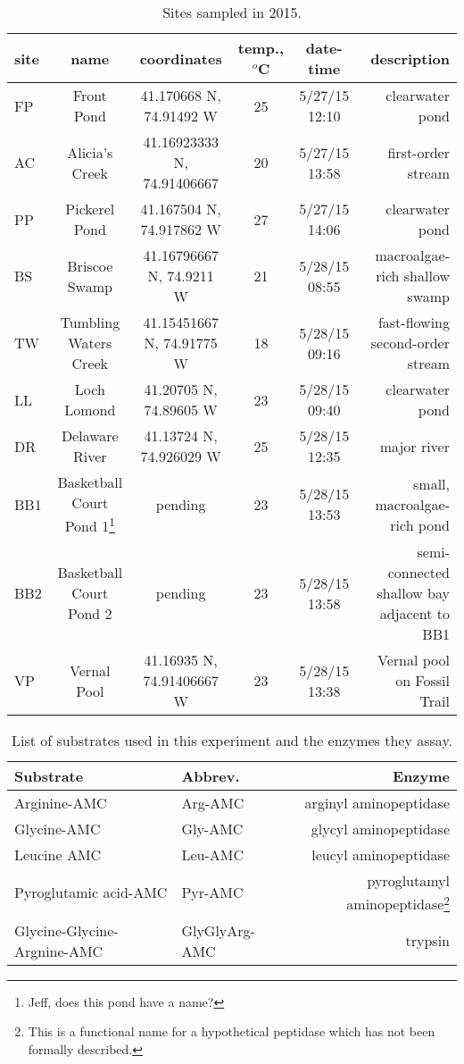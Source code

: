 \documentclass{article}
\begin{document}
    \begin{landscape}
    
    \begin{table}
    \centering
    \begin{tabular}{l c c c c r}
    site & name & coordinates & temp., $^o$C & date-time & description \\
    \hline
    FP & Front Pond & 41.170668 N, 74.91492 W & 25 & 5/27/15 12:10 & clearwater pond \\
    AC & Alicia's Creek & 41.16923333 N, 74.91406667 & 20 & 5/27/15 13:58 & first-order stream \\
    PP & Pickerel Pond & 41.167504 N, 74.917862 W & 27 & 5/27/15 14:06 & clearwater pond \\
    BS & Briscoe Swamp & 41.16796667 N, 74.9211 W & 21 & 5/28/15 08:55 & macroalgae-rich shallow swamp \\
    TW & Tumbling Waters Creek & 41.15451667 N, 74.91775 W & 18 & 5/28/15 09:16  & fast-flowing second-order stream \\
    LL & Loch Lomond & 41.20705 N, 74.89605 W & 23 & 5/28/15 09:40 & clearwater pond \\
    DR & Delaware River & 41.13724 N, 74.926029 W & 25 & 5/28/15 12:35 & major river \\
    BB1 & Basketball Court Pond 1\footnote{Jeff, does this pond have a name?} & pending & 23 & 5/28/15 13:53 & small, macroalgae-rich pond \\
    BB2 & Basketball Court Pond 2 & pending & 23 & 5/28/15 13:58 & semi-connected shallow bay adjacent to BB1 \\
    VP & Vernal Pool & 41.16935 N, 74.91406667 W & 23 & 5/28/15 13:38 & Vernal pool on Fossil Trail \\
    \hline
    \end{tabular}
    \caption{Sites sampled in 2015. \label{sites.table}}
    \end{table}
    
    \begin{table}
    \centering
    \begin{tabular}{l l r}
    Substrate              & Abbrev. & Enzyme \\
    \hline
    Arginine-AMC & Arg-AMC & arginyl aminopeptidase \\
    Glycine-AMC & Gly-AMC & glycyl aminopeptidase \\
    Leucine AMC & Leu-AMC & leucyl aminopeptidase \\
    Pyroglutamic acid-AMC & Pyr-AMC & pyroglutamyl aminopeptidase\footnote{This is a functional name for a hypothetical peptidase which has not been formally described.} \\
    Glycine-Glycine-Argnine-AMC & GlyGlyArg-AMC & trypsin \\
    \end{tabular}
    \caption{List of substrates used in this experiment and the enzymes they assay.}
    \label{substrate.table}
    \end{table}
    

\end{landscape}
\end{document}
